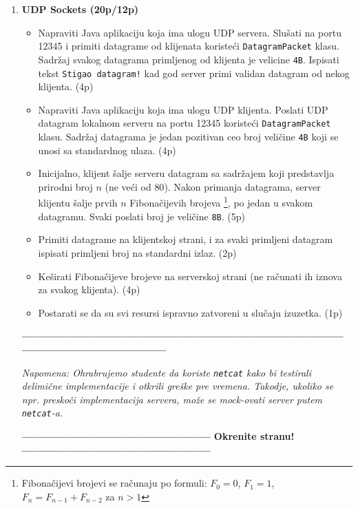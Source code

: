 \documentclass[]{article}
\begin{document}
\begin{enumerate}
\item \textbf{UDP Sockets (20p/12p)}
  \begin{itemize}
    \item Napraviti Java aplikaciju koja ima ulogu UDP servera. Slušati na portu 12345 i primiti datagrame od klijenata koristeći \texttt{DatagramPacket} klasu. Sadržaj svakog datagrama primljenog od klijenta je velicine \texttt{4B}. Ispisati tekst \texttt{Stigao datagram!} kad god server primi validan datagram od nekog klijenta. \hfill (4p)
    \item Napraviti Java aplikaciju koja ima ulogu UDP klijenta. Poslati UDP datagram lokalnom serveru na portu 12345 koristeći \texttt{DatagramPacket} klasu. Sadržaj datagrama je jedan pozitivan ceo broj veličine \texttt{4B} koji se unosi sa standardnog ulaza. \hfill (4p)
    \item Inicijalno, klijent šalje serveru datagram sa sadržajem koji predstavlja prirodni broj $n$ (ne veći od $80$). Nakon primanja datagrama, server klijentu šalje prvih $n$ Fibonačijevih brojeva \footnote{Fibonačijevi brojevi se računaju po formuli: $F_0 = 0$, $F_1 = 1$, $F_n = F_{n-1} + F_{n-2}$ za $n > 1$}, po jedan u svakom datagramu. Svaki poslati broj je veličine \texttt{8B}. \hfill (5p)
    \item Primiti datagrame na klijentskoj strani, i za svaki primljeni datagram ispisati primljeni broj na standardni izlaz. \hfill (2p)
    \item Keširati Fibonačijeve brojeve na serverskoj strani (ne računati ih iznova za svakog klijenta). \hfill (4p)
    \item Postarati se da su svi resursi ispravno zatvoreni u slučaju izuzetka. \hfill (1p)
\end{itemize}

\vspace{15pt}

\begin{center}
  \textbf{------------------------------------------------------------------------------------------------------------------------------}
\end{center}
\textit{Napomena: Ohrabrujemo studente da koriste \texttt{netcat} kako bi testirali delimi\v{c}ne implementacije i otkrili gre\v{s}ke pre vremena. Takodje, ukoliko se npr. presko\v{c}i implementacija servera, mo\v{z}e se mock-ovati server putem \texttt{netcat}-a.} 
\begin{center}
  \textbf{--------------------------------------------------- Okrenite stranu! ---------------------------------------------------}
\end{center}


\end{enumerate}
\end{document}
